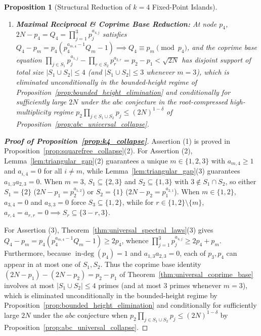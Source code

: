 \documentclass[11pt,a4paper]{article}
\newtheorem{proposition}[theorem]{Proposition}
\theoremstyle{definition}
\begin{document}
\begin{proposition}[Structural Reduction of $k=4$ Fixed-Point Islands]
\begin{enumerate}
    \item \textbf{Maximal Reciprocal \& Coprime Base Reduction:} At node $p_4$, $2N - p_4 = Q_4 = \prod_{j=1}^3 p_j^{a_{4,j}}$ satisfies $Q_4 - p_m = p_4(p_4^{a_{m,4}-1} Q_m - 1) \implies Q_4 \equiv p_m \pmod{p_4}$, and the coprime base equation $\prod_{j \in S_1} p_j^{a_{1,j}} - \prod_{r \in S_2} p_r^{a_{2,r}} = p_2 - p_1 < \sqrt{2N}$ has disjoint support of total size $|S_1 \cup S_2| \le 4$ (and $|S_1 \cup S_2| \le 3$ whenever $m = 3$), which is eliminated unconditionally in the bounded-height regime of Proposition~\ref{prop:bounded_height_elimination} and conditionally for sufficiently large $2N$ under the $abc$ conjecture in the root-compressed high-multiplicity regime $p_2 \prod_{j \in S_1 \cup S_2} p_j \le (2N)^{1 - \delta}$ of Proposition~\ref{prop:abc_universal_collapse}.
\end{enumerate}
\end{proposition}
\begin{proof}[\textbf{Proof of Proposition~\ref{prop:k4_collapse}}]
Assertion (1) is proved in Proposition~\ref{prop:squarefree_collapse}(2). For Assertion (2), Lemma~\ref{lem:triangular_gap}(2) guarantees a unique $m \in \{1, 2, 3\}$ with $a_{m,4} \ge 1$ and $a_{i,4} = 0$ for all $i \ne m$, while Lemma~\ref{lem:triangular_gap}(3) guarantees $a_{1,3} a_{2,3} = 0$. When $m = 3$, $S_1 \subseteq \{2, 3\}$ and $S_2 \subseteq \{1, 3\}$ with $3 \notin S_1 \cap S_2$, so either $S_1 = \{2\}$ ($2N - p_1 = p_2^{a_{1,2}}$) or $S_2 = \{1\}$ ($2N - p_2 = p_1^{a_{2,1}}$). When $m \in \{1, 2\}$, $a_{3,4} = 0$ and $a_{3,3} = 0$ force $S_3 \subseteq \{1, 2\}$, while for $r \in \{1, 2\} \setminus \{m\}$, $a_{r,4} = a_{r,r} = 0 \implies S_r \subseteq \{3 - r, 3\}$.

For Assertion (3), Theorem~\ref{thm:universal_spectral_laws}(3) gives $Q_4 - p_m = p_4(p_4^{a_{m,4}-1} Q_m - 1) \ge 2p_4$, whence $\prod_{j=1}^3 p_j^{a_{4,j}} \ge 2p_4 + p_m$. Furthermore, because $\operatorname{in-deg}(p_4) = 1$ and $a_{1,3} a_{2,3} = 0$, each of $p_3, p_4$ can appear in at most one of $S_1, S_2$. Thus the coprime base identity $(2N - p_1) - (2N - p_2) = p_2 - p_1$ of Theorem~\ref{thm:universal_coprime_base} involves at most $|S_1 \cup S_2| \le 4$ primes (and at most $3$ primes whenever $m = 3$), which is eliminated unconditionally in the bounded-height regime by Proposition~\ref{prop:bounded_height_elimination} and conditionally for sufficiently large $2N$ under the $abc$ conjecture when $p_2 \prod_{j \in S_1 \cup S_2} p_j \le (2N)^{1 - \delta}$ by Proposition~\ref{prop:abc_universal_collapse}.
\end{proof}
\end{document}
